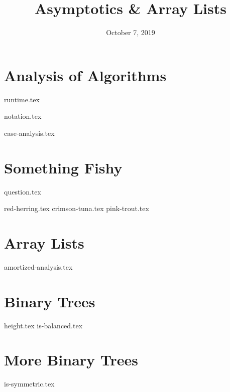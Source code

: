 \documentclass[11pt]{exam}
\title{Asymptotics \& Array Lists}
\date{October 7, 2019}
\begin{document}
\maketitle

\section{Analysis of Algorithms}
{runtime.tex}
\begin{questions}

{notation.tex}

{case-analysis.tex}
\end{questions}

\clearpage

\section{Something Fishy}
{question.tex}
\begin{questions}
{red-herring.tex}
{crimson-tuna.tex}
{pink-trout.tex}
\end{questions}

\clearpage
\section{Array Lists}
\begin{questions}
{amortized-analysis.tex}
\end{questions}

\section{Binary Trees}
\begin{questions}
{height.tex}
{is-balanced.tex}
\end{questions}

\section{More Binary Trees}
\begin{questions}
{is-symmetric.tex}
\end{questions}
\end{document}
